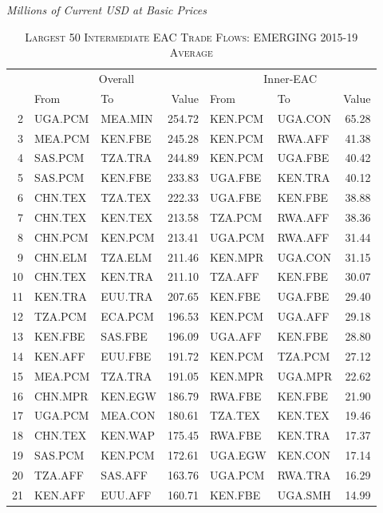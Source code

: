 \documentclass[a4paper]{article}
\begin{document}
\begin{table}[ht]
\centering
  \caption{\label{tab:weaclfl}\textsc{Largest 50 Intermediate EAC Trade Flows: EMERGING 2015-19 Average}} 
  \small{\textit{Millions of Current USD at Basic Prices}}
\begin{tabular}{rllrllr}
  \toprule
 & \multicolumn{3}{c}{Overall} & \multicolumn{3}{c}{Inner-EAC} \\
 & From & To & Value & From & To & Value \\ 
  \midrule
  2 & UGA.PCM & MEA.MIN & 254.72 & KEN.PCM & UGA.CON & 65.28 \\ 
  3 & MEA.PCM & KEN.FBE & 245.28 & KEN.PCM & RWA.AFF & 41.38 \\ 
  4 & SAS.PCM & TZA.TRA & 244.89 & KEN.PCM & UGA.FBE & 40.42 \\ 
  5 & SAS.PCM & KEN.FBE & 233.83 & UGA.FBE & KEN.TRA & 40.12 \\ 
  6 & CHN.TEX & TZA.TEX & 222.33 & UGA.FBE & KEN.FBE & 38.88 \\ 
  7 & CHN.TEX & KEN.TEX & 213.58 & TZA.PCM & RWA.AFF & 38.36 \\ 
  8 & CHN.PCM & KEN.PCM & 213.41 & UGA.PCM & RWA.AFF & 31.44 \\ 
  9 & CHN.ELM & TZA.ELM & 211.46 & KEN.MPR & UGA.CON & 31.15 \\ 
  10 & CHN.TEX & KEN.TRA & 211.10 & TZA.AFF & KEN.FBE & 30.07 \\ 
  11 & KEN.TRA & EUU.TRA & 207.65 & KEN.FBE & UGA.FBE & 29.40 \\ 
  12 & TZA.PCM & ECA.PCM & 196.53 & KEN.PCM & UGA.AFF & 29.18 \\ 
  13 & KEN.FBE & SAS.FBE & 196.09 & UGA.AFF & KEN.FBE & 28.80 \\ 
  14 & KEN.AFF & EUU.FBE & 191.72 & KEN.PCM & TZA.PCM & 27.12 \\ 
  15 & MEA.PCM & TZA.TRA & 191.05 & KEN.MPR & UGA.MPR & 22.62 \\ 
  16 & CHN.MPR & KEN.EGW & 186.79 & RWA.FBE & KEN.FBE & 21.90 \\ 
  17 & UGA.PCM & MEA.CON & 180.61 & TZA.TEX & KEN.TEX & 19.46 \\ 
  18 & CHN.TEX & KEN.WAP & 175.45 & RWA.FBE & KEN.TRA & 17.37 \\ 
  19 & SAS.PCM & KEN.PCM & 172.61 & UGA.EGW & KEN.CON & 17.14 \\ 
  20 & TZA.AFF & SAS.AFF & 163.76 & UGA.PCM & RWA.TRA & 16.29 \\ 
  21 & KEN.AFF & EUU.AFF & 160.71 & KEN.FBE & UGA.SMH & 14.99 \\ 

\end{tabular}
\end{table}
\end{document}
